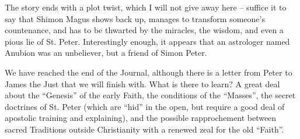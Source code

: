 The story ends with a plot twist, which I will not give away here -- suffice it to say that Shimon Magus shows back up, manages to transform someone's countenance, and has to be thwarted by the miracles, the wisdom, and even a pious lie of St. Peter. Interestingly enough, it appears that an astrologer named Anubion was an unbeliever, but a friend of Simon Peter.

We have reached the end of the Journal, although there is a letter from Peter to James the Just that we will finish with. What is there to learn? A great deal about the ``Genesis'' of the early Faith, the conditions of the ``Masses'', the secret doctrines of St. Peter (which are ``hid'' in the open, but require a good deal of apostolic training and explaining), and the possible rapprochement between sacred Traditions outside Christianity with a renewed zeal for the old ``Faith''.



